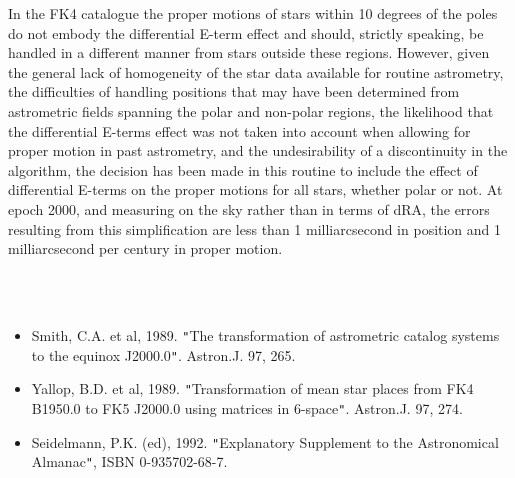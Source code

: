 \documentclass[twoside,11pt]{article}
\renewcommand{\_}{\texttt{\symbol{95}}}
\newcommand{\sstdiytopic}[2]{\item[{\hspace{-0.35em}#1\hspace{-0.35em}:}]
\mbox{} \\[1.3ex] #2}
\newcommand{\sstitemlist}[1]{
  \mbox{} \\
  \vspace{-3.5ex}
  \begin{itemize}
     #1
  \end{itemize}
}
\newcommand{\sstitem}{\item}
\newcommand{\sstdiytopic}[2]{\item[{#1}] #2 }
\newcommand{\sstitemlist}[1]{
      \begin{itemize}
         #1
      \end{itemize}
      \\
   }
\newcommand{\sstitem}{\item}
\begin{document}
{{{         \sstitem
         In the FK4 catalogue the proper motions of stars within
         10 degrees of the poles do not embody the differential
         E-term effect and should, strictly speaking, be handled
         in a different manner from stars outside these regions.
         However, given the general lack of homogeneity of the star
         data available for routine astrometry, the difficulties of
         handling positions that may have been determined from
         astrometric fields spanning the polar and non-polar regions,
         the likelihood that the differential E-terms effect was not
         taken into account when allowing for proper motion in past
         astrometry, and the undesirability of a discontinuity in
         the algorithm, the decision has been made in this routine to
         include the effect of differential E-terms on the proper
         motions for all stars, whether polar or not.  At epoch 2000,
         and measuring on the sky rather than in terms of dRA, the
         errors resulting from this simplification are less than
         1 milliarcsecond in position and 1 milliarcsecond per
         century in proper motion.
      }
   }
   \sstdiytopic{
      References
   }{
      \sstitemlist{

         \sstitem
         Smith, C.A. et al, 1989.  {\tt "}The transformation of astrometric
           catalog systems to the equinox J2000.0{\tt "}.  Astron.J. 97, 265.

         \sstitem
         Yallop, B.D. et al, 1989.  {\tt "}Transformation of mean star places
           from FK4 B1950.0 to FK5 J2000.0 using matrices in 6-space{\tt "}.
           Astron.J. 97, 274.

         \sstitem
         Seidelmann, P.K. (ed), 1992.  {\tt "}Explanatory Supplement to
           the Astronomical Almanac{\tt "}, ISBN 0-935702-68-7.
      }
   }
}
\end{document}
